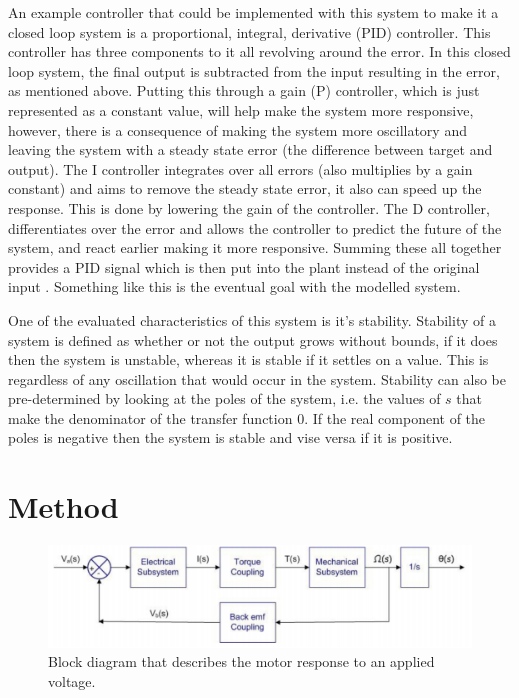 \documentclass[a4paper, 11pt, compsoc]{IEEEtran}
\begin{document}
        An example controller that could be implemented with this system to make it a closed loop system is a proportional, integral, derivative (PID) controller. This controller has three components to it all revolving around the error. In this closed loop system, the final output is subtracted from the input resulting in the error, as mentioned above. Putting this through a gain (P) controller, which is just represented as a constant value, will help make the system more responsive, however, there is a consequence of making the system more oscillatory and leaving the system with a steady state error (the difference between target and output). The I controller integrates over all errors (also multiplies by a gain constant) and aims to remove the steady state error, it also can speed up the response. This is done by lowering the gain of the controller. The D controller, differentiates over the error and allows the controller to predict the future of the system, and react earlier making it more responsive. Summing these all together provides a PID signal which is then put into the plant instead of the original input \cite{elprocus}. Something like this is the eventual goal with the modelled system.
        \par
        One of the evaluated characteristics of this system is it's stability. Stability of a system is defined as whether or not the output grows without bounds, if it does then the system is unstable, whereas it is stable if it settles on a value. This is regardless of any oscillation that would occur in the system. Stability can also be pre-determined by looking at the poles of the system, i.e. the values of $s$ that make the denominator of the transfer function $0$. If the real component of the poles is negative then the system is stable and vise versa if it is positive.        


    \section{Method}\label{sec:methods}
        \begin{figure}[!h]
            \centering
            \includegraphics[width=\columnwidth]{motorTF.png}
            \caption{Block diagram that describes the motor response to an applied voltage. \cite{gouws_2008}}
            \label{fig:motorBlockDiagram}
        \end{figure}
        
\end{document}

